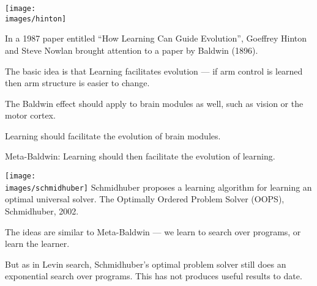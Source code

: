 {\texttt{[image: \\images/hinton]}

In a 1987 paper entitled ``How Learning Can Guide Evolution'', Goeffrey Hinton and Steve Nowlan brought attention to a paper by Baldwin (1896).

\vfill
The basic idea is that Learning facilitates evolution --- if arm control is learned then arm structure is easier to change.


The Baldwin effect should apply to brain modules as well, such as vision or the motor cortex.

\vfill
Learning should facilitate the evolution of brain modules.

\vfill
Meta-Baldwin: Learning should then facilitate the evolution of learning.

\vfill
\texttt{[image: \\images/schmidhuber]}
Schmidhuber proposes a learning algorithm for learning an optimal universal solver.
The Optimally Ordered Problem Solver (OOPS), Schmidhuber, 2002.

\vfill
The ideas are similar to Meta-Baldwin --- we learn to search over programs, or learn the learner.

\vfill
\vfill
But as in Levin search, Schmidhuber's optimal problem solver still does an exponential search over programs.  This
has not produces useful results to date.


}

